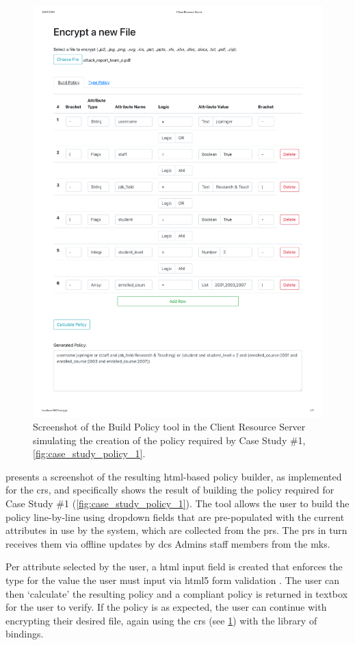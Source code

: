 \begin{figure}
    \centering
    \includegraphics[width=\linewidth,keepaspectratio]{appendices/building_policy.pdf}

    \caption{
      \label{fig:policy_builder}
      Screenshot of the Build Policy tool in the Client Resource Server simulating the creation of the policy required by Case Study \#1, \cref{fig:case_study_policy_1}.
    }

\end{figure}

 presents a screenshot of the resulting \acrshort{html}-based policy builder, as implemented for the \acrshort{crs}, and specifically shows the result of building the policy required for Case Study \#1 (\cref{fig:case_study_policy_1}). The tool allows the user to build the policy line-by-line using dropdown fields that are pre-populated with the current attributes in use by the \theResServer system, which are collected from the \acrshort{prs}. The \acrshort{prs} in turn receives them via offline updates by \acrshort{dcs} Admins staff members from the \acrshort{mks}.

Per attribute selected by the user, a \acrshort{html} input field is created that enforces the type for the value the user must input via \acrshort{html}5 form validation \citep{Foundation2019}. The user can then `calculate' the resulting policy and a \PyOpenABE compliant policy is returned in textbox for the user to verify. If the policy is as expected, the user can continue with encrypting their desired file, again using the \acrshort{crs} (see \cref{fig:policy_builder}) with the \PyOpenABE library of bindings.
